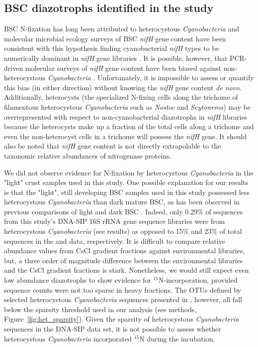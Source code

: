 \subsection{BSC diazotrophs identified in the study} BSC N-fixation has long
been attributed to heterocystous \textit{Cyanobacteria} and molecular
microbial ecology surveys of BSC \textit{nifH} gene content have been
consistent with this hypothesis finding cyanobacterial \textit{nifH} types
to be numerically dominant in \textit{nifH} gene libraries
\citep{Yeager,14766579,Yeager_2012}. It is possible, however, that PCR-driven
molecular surveys of \textit{nifH} gene content have been biased against
non-heterocystous \textit{Cyanobacteria} \citep{Gaby_2012}. Unfortunately, it
is impossible to assess or quantify this bias (in either direction) without
knowing the \textit{nifH} gene content \textit{de novo}. Additionally,
heterocysts (the specialized N-fixing cells along the trichome of filamentous
heterocystous \textit{Cyanobacteria} such as \textit{Nostoc} and
\textit{Scytonema}) may be overrepresented with respect to non-cyanobacterial
diazotrophs in \textit{nifH} libraries because the heterocysts make up a
fraction of the total cells along a trichome and even the non-heterocyst cells
in a trichome will possess the \textit{nifH} gene. It should also be noted that
\textit{nifH} gene content is not directly extrapolable to the taxonomic
relative abundances of nitrogenase proteins.

We did not observe evidence for N-fixation by heterocystous
\textit{Cyanobacteria} in the "light" crust samples used in this study. One
possible explanation for our results is that the "light", still developing
BSC samples used in this study possessed less heterocystous
\textit{Cyanobacteria} than dark mature BSC, as has been observed in previous
comparisons of light and dark BSC \citep{14766579}.  Indeed, only 0.29\% of
sequences from this study's DNA-SIP 16S rRNA gene sequence libraries were
from heterocystous \textit{Cyanobacteria} (see results) as opposed to 15\%
and 23\% of total sequences in the \citet{Steven_2013} and
\citet{Garcia_Pichel_2013} data, respectively. It is difficult to compare
relative abundance values from CsCl gradient fractions against environmental
libraries, but, a three order of magnitude difference between the
environmental libraries and the CsCl gradient fractions is stark.
Nonetheless, we would still expect even low abundance diazotrophs to show
evidence for $^{15}$N-incorporation, provided sequence counts were not too
sparse in heavy fractions. The OTUs defined by selected heterocystous
\textit{Cyanobacteria} sequences presented in \citet{Yeager}, however, all
fall below the sparsity threshold used in our analysis (see methods,
Figure~\ref{fig:het_sparsity}). Given the sparsity of heterocystous
\textit{Cyanobacteria} sequences in the DNA-SIP data set, it is not possible
to assess whether heterocystous \textit{Cyanobacteria} incorporated $^{15}$N
during the incubation.

